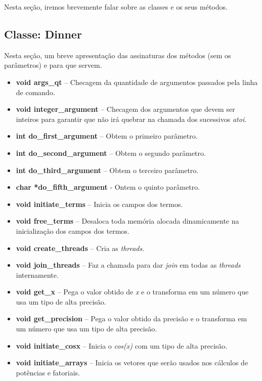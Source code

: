\documentclass[11pt]{article}
\begin{document}
Nesta seção, iremos brevemente falar sobre as classes e os seus métodos.


\subsection{Classe: Dinner}
Nesta seção, um breve apresentação das assinaturas dos métodos (sem os parâmetros) e para que servem.
\begin{itemize}
	\item \textbf{\textcolor{sblue}{void} args\_qt} -- Checagem da quantidade de argumentos passados pela linha de comando.
	\item \textbf{\textcolor{sblue}{void} integer\_argument} -- Checagem dos argumentos que devem ser inteiros para garantir que não irá quebrar na chamada dos sucessivos \textit{atoi}.
	\item \textbf{\textcolor{sblue}{int} do\_first\_argument} -- Obtem o primeiro parâmetro.
	\item \textbf{\textcolor{sblue}{int} do\_second\_argument} -- Obtem o segundo parâmetro.
	\item \textbf{\textcolor{sblue}{int} do\_third\_argument} -- Obtem o terceiro parâmetro.
	\item \textbf{\textcolor{sblue}{char} *do\_fifth\_argument} - Ontem o quinto parâmetro.
	\item \textbf{\textcolor{sblue}{void} initiate\_terms} -- Inicia os campos dos termos.
	\item \textbf{\textcolor{sblue}{void} free\_terms} -- Desaloca toda memória alocada dinamicamente na inicialização dos campos dos termos.
	\item \textbf{\textcolor{sblue}{void} create\_threads} -- Cria as \textit{threads}.
	\item \textbf{\textcolor{sblue}{void} join\_threads} -- Faz a chamada para dar \textit{join} em todas as \textit{threads} internamente.
	\item \textbf{\textcolor{sblue}{void} get\_x} -- Pega o valor obtido de \textit{x} e o transforma em um número que usa um tipo de alta precisão.
	\item \textbf{\textcolor{sblue}{void} get\_precision} -- Pega o valor obtido da precisão e o transforma em um número que usa um tipo de alta precisão.
	\item \textbf{\textcolor{sblue}{void} initiate\_cosx} -- Inicia o \textit{cos(x)} com um tipo de alta precisão.
	\item \textbf{\textcolor{sblue}{void} initiate\_arrays} -- Inicia os vetores que serão usados nos cálculos de potências e fatoriais.

\end{itemize}
\end{document}
